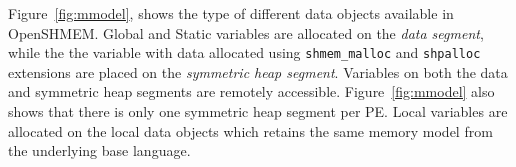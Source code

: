 Figure~\ref{fig:mmodel}, shows the type of different data objects available in
OpenSHMEM. Global and Static variables are allocated on the \emph{data segment},
while the the variable with data allocated using \texttt{shmem\_malloc} and
\texttt{shpalloc} extensions are placed on the \emph{symmetric heap segment}.
Variables on both the data and symmetric heap segments are remotely accessible.
Figure~\ref{fig:mmodel} also shows that there is only one symmetric heap segment
per PE. Local variables are allocated on the local data objects which retains the
same memory model from the underlying base language.